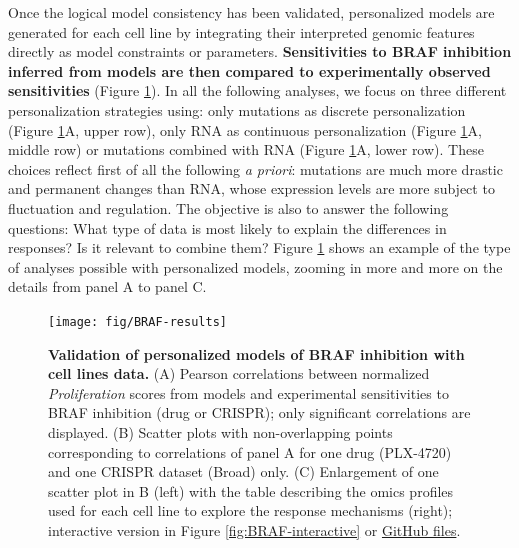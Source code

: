 \documentclass[a4paper,12pt,twoside,onecolumn,openright,final,oldfontcommands]{memoir}
\begin{document}
Once the logical model consistency has been validated, personalized
models are generated for each cell line by integrating their interpreted
genomic features directly as model constraints or parameters.
\textbf{Sensitivities to BRAF inhibition inferred from models are then
compared to experimentally observed sensitivities} (Figure
\ref{fig:BRAF-results}). In all the following analyses, we focus on
three different personalization strategies using: only mutations as
discrete personalization (Figure \ref{fig:BRAF-results}A, upper row),
only RNA as continuous personalization (Figure \ref{fig:BRAF-results}A,
middle row) or mutations combined with RNA (Figure
\ref{fig:BRAF-results}A, lower row). These choices reflect first of all
the following \emph{a priori}: mutations are much more drastic and
permanent changes than RNA, whose expression levels are more subject to
fluctuation and regulation. The objective is also to answer the
following questions: What type of data is most likely to explain the
differences in responses? Is it relevant to combine them? Figure
\ref{fig:BRAF-results} shows an example of the type of analyses possible
with personalized models, zooming in more and more on the details from
panel A to panel C.

\begin{figure}

{\centering \texttt{[image: fig/BRAF-results]} 

}

\caption[Validation of personalized models of BRAF inhibition with cell lines data]{\textbf{Validation of personalized models of
BRAF inhibition with cell lines data.} (A) Pearson correlations between
normalized \emph{Proliferation} scores from models and experimental
sensitivities to BRAF inhibition (drug or CRISPR); only significant
correlations are displayed. (B) Scatter plots with non-overlapping
points corresponding to correlations of panel A for one drug (PLX-4720)
and one CRISPR dataset (Broad) only. (C) Enlargement of one scatter plot
in B (left) with the table describing the omics profiles used for each
cell line to explore the response mechanisms (right); interactive
version in Figure \ref{fig:BRAF-interactive} or
\href{https://github.com/sysbio-curie/PROFILE_BRAF_Model/blob/master/Analysis.html}{GitHub
files}.}\label{fig:BRAF-results}
\end{figure}
\end{document}
